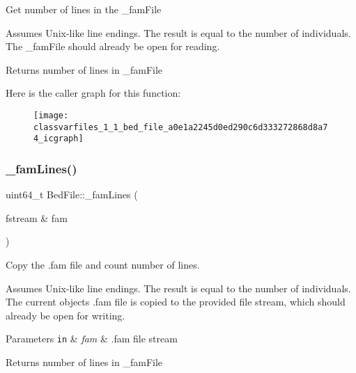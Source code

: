 Get number of lines in the {\ttfamily \+\_\+fam\+File} 

Assumes Unix-\/like line endings. The result is equal to the number of individuals. The {\ttfamily \+\_\+fam\+File} should already be open for reading.

\begin{DoxyReturn}{Returns}
number of lines in {\ttfamily \+\_\+fam\+File} 
\end{DoxyReturn}
Here is the caller graph for this function\+:\nopagebreak
\begin{figure}[H]
\begin{center}
\leavevmode
\texttt{[image: classvarfiles\_1\_1\_bed\_file\_a0e1a2245d0ed290c6d333272868d8a74\_icgraph]}
\end{center}
\end{figure}
\mbox{\label{classvarfiles_1_1_bed_file_a646e0a39517924cfd4f8f6ea394dd940}} 
\subsubsection{\texorpdfstring{\+\_\+fam\+Lines()}{\_famLines()}\hspace{0.1cm}{\footnotesize\ttfamily [2/2]}}
{\footnotesize\ttfamily uint64\+\_\+t Bed\+File\+::\+\_\+fam\+Lines (\begin{DoxyParamCaption}\item[{fstream \&}]{fam }\end{DoxyParamCaption})\hspace{0.3cm}{\ttfamily [protected]}}



Copy the .fam file and count number of lines. 

Assumes Unix-\/like line endings. The result is equal to the number of individuals. The current object\textquotesingle{}s .fam file is copied to the provided file stream, which should already be open for writing.


\begin{DoxyParams}[1]{Parameters}
\mbox{\tt in}  & {\em fam} & .fam file stream\\
\hline
\end{DoxyParams}
\begin{DoxyReturn}{Returns}
number of lines in {\ttfamily \+\_\+fam\+File} 
\end{DoxyReturn}
\mbox{\label{classvarfiles_1_1_bed_file_a927cd985ae4d5897a052c2219391eae3}} 
